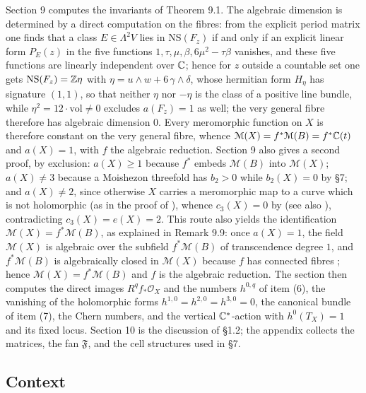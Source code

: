 Section 9 computes the invariants of Theorem 9.1. The algebraic dimension is determined by a direct computation on the fibres: from the explicit period matrix one finds that a class $E \in \Lambda^2 V$ lies in $\mathrm{NS}(F_z)$ if and only if an explicit linear form $P_E(z)$ in the five functions $1,\tau,\mu,\beta,6\mu^2-\tau\beta$ vanishes, and these five functions are linearly independent over $\mathbb{C}$; hence for $z$ outside a countable set one gets $\mathrm{NS}(F_z) = \mathbb{Z}\eta$ with $\eta = u\wedge w + 6\,\gamma\wedge\delta$, whose hermitian form $H_\eta$ has signature $(1,1)$, so that neither $\eta$ nor $-\eta$ is the class of a positive line bundle, while $\eta^2 = 12\cdot\mathrm{vol} \ne 0$ excludes $a(F_z) = 1$ as well; the very general fibre therefore has algebraic dimension $0$. Every meromorphic function on $X$ is therefore constant on the very general fibre, whence $\mathcal M(X) = f^*\mathcal M(B) = f^*\mathbb{C}(t)$ and $a(X) = 1$, with $f$ the algebraic reduction. Section 9 also gives a second proof, by exclusion: $a(X) \ge 1$ because $f^*$ embeds $\mathcal M(B)$ into $\mathcal M(X)$; $a(X) \ne 3$ because a Moishezon threefold has $b_2 > 0$ \cite[Lemma 1.4]{CDP98} while $b_2(X) = 0$ by \S7; and $a(X) \ne 2$, since otherwise $X$ carries a meromorphic map to a curve which is not holomorphic (as in the proof of \cite[Cor.\ 2.3]{CDP20}), whence $c_3(X) = 0$ by \cite[Thm.\ 2.1]{CDP20} (see also \cite[Thm.\ 3.1]{LRS}), contradicting $c_3(X) = e(X) = 2$. This route also yields the identification $\mathcal M(X) = f^*\mathcal M(B)$, as explained in Remark 9.9: once $a(X) = 1$, the field $\mathcal M(X)$ is algebraic over the subfield $f^*\mathcal M(B)$ of transcendence degree $1$, and $f^*\mathcal M(B)$ is algebraically closed in $\mathcal M(X)$ because $f$ has connected fibres \cite[\S3]{Ue75}; hence $\mathcal M(X) = f^*\mathcal M(B)$ and $f$ is the algebraic reduction. The section then computes the direct images $R^q f_*\mathcal O_X$ and the numbers $h^{0,q}$ of item (6), the vanishing of the holomorphic forms $h^{1,0} = h^{2,0} = h^{3,0} = 0$, the canonical bundle of item (7), the Chern numbers, and the vertical $\mathbb{C}^*$-action with $h^0(T_X) = 1$ and its fixed locus. Section 10 is the discussion of \S1.2; the appendix collects the matrices, the fan $\mathfrak F$, and the cell structures used in \S7.

\subsection{Context}

